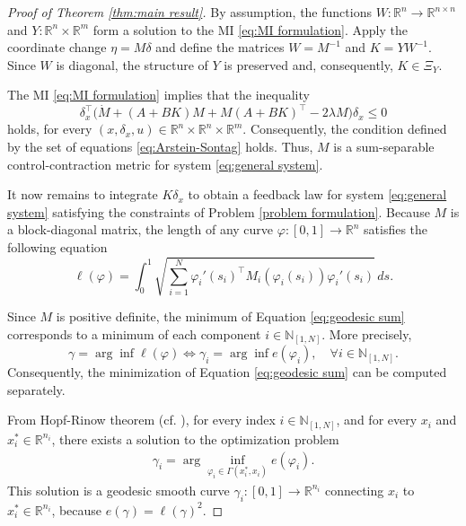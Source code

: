 \documentclass[10pt,twocolumn,twoside]{IEEEtran}
\theoremstyle{plain}
\theoremstyle{definition}
\theoremstyle{remark}
\begin{document}
\begin{proof}[Proof of Theorem \ref{thm:main result}]
	By assumption, the functions $W:\mathbb{R}^n\to\mathbb{R}^{n\times n}$ and $Y:\mathbb{R}^n\times\mathbb{R}^m$ form a solution to the MI \eqref{eq:MI formulation}. Apply the coordinate change $\eta=M\delta$ and define the matrices $W=M^{-1}$ and $K=YW^{-1}$. Since $W$ is diagonal, the structure of $Y$ is preserved and, consequently, $K\in\Xi_Y$.
	
	The MI \eqref{eq:MI formulation} implies that the inequality
	\begin{equation*}
		\delta_x^\top\bigg(\dot{M}+(A+BK)M+M(A+BK)^\top-2\lambda M\bigg)\delta_x\leq0
	\end{equation*}
	holds, for every $(x,\delta_x,u)\in\mathbb{R}^n\times\mathbb{R}^n\times\mathbb{R}^m$. Consequently, the condition defined by the set of equations \eqref{eq:Arstein-Sontag} holds. Thus, $M$ is a sum-separable control-contraction metric for system \eqref{eq:general system}.
	
	It now remains to integrate $K\delta_x$ to obtain a feedback law for system \eqref{eq:general system} satisfying the constraints of Problem \ref{problem formulation}. Because $M$ is a block-diagonal matrix, the length of any curve $\varphi:[0,1]\to\mathbb{R}^n$ satisfies the following equation
	\begin{equation}\label{eq:geodesic sum}
		\ell(\varphi)=\int_0^1\sqrt{\sum_{i=1}^N \varphi_i'(s_i)^\top M_i(\varphi_i(s_i))\varphi_i'(s_i)}\,ds.
	\end{equation}

	
	Since $M$ is positive definite, the minimum of Equation \eqref{eq:geodesic sum} corresponds to a minimum of each component $i\in\mathbb{N}_{[1,N]}$. More precisely, 
	\begin{equation*}
		\gamma=\arg\inf\ell(\varphi)\Leftrightarrow\gamma_i=\arg\inf e(\varphi_i),\quad\forall i\in\mathbb{N}_{[1,N]}.
	\end{equation*}
	Consequently, the minimization of Equation \eqref{eq:geodesic sum} can be computed separately. 
	
	From Hopf-Rinow theorem (cf. \cite[Theorem 7.7]{Boothby1986}), for every index $i\in\mathbb{N}_{[1,N]}$, and for every $x_i$ and $x_i^\ast\in\mathbb{R}^{n_i}$, there exists a solution to the optimization problem
	\begin{align*}
		\gamma_i=\arg\inf_{\varphi_i\in\Gamma(x_i^\ast,x_i)} e(\varphi_i).
	\end{align*}
	This solution is a geodesic smooth curve $\gamma_i:[0,1]\to\mathbb{R}^{n_i}$ connecting $x_i$ to $x_i^\ast\in\mathbb{R}^{n_i}$, because $e(\gamma)=\ell(\gamma)^2$.
	

\end{proof}
\end{document}
